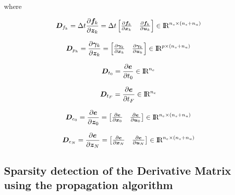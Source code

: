 \documentclass[12pt]{article}
\newcommand{\real}{\mbox{\rm I$\!$R}}
\begin{document}
\noindent where

\begin{equation}
    \bm{D}_{f_k}=\Delta t \frac{\partial \bm{f}_k}{\partial \bm{z}_k}= \Delta t 
    \begin{bmatrix}
     \frac{\partial \bm{f}_k}{\partial \bm{x}_k} & \frac{\partial \bm{f}_k}{\partial \bm{u}_k} 
    \end{bmatrix} \in \real^{n_s \times (n_s+n_u)}
\end{equation}

\begin{equation}
    \bm{D}_{p_k}=\frac{\partial \bm{\gamma}_k}{\partial \bm{z}_k}= 
    \begin{bmatrix}
     \frac{\partial \bm{\gamma}_k}{\partial \bm{x}_k} & \frac{\partial \bm{\gamma}_k}{\partial \bm{u}_k} 
    \end{bmatrix} \in \real^{p \times (n_s+n_u)}
\end{equation}

\begin{equation}
    \bm{D}_{t_0}=\frac{\partial \bm{e}}{\partial t_0}  \in \real^{n_e}
\end{equation}

\begin{equation}
    \bm{D}_{t_F}=\frac{\partial \bm{e}}{\partial t_F}  \in \real^{n_e}
\end{equation}

\begin{equation}
    \bm{D}_{e_0}=\frac{\partial \bm{e}}{\partial \bm{z}_0}= 
    \begin{bmatrix}
     \frac{\partial \bm{e}}{\partial \bm{x}_0} & \frac{\partial \bm{e}}{\partial \bm{u}_0} 
    \end{bmatrix} \in \real^{n_e \times (n_s+n_u)}
\end{equation}

\begin{equation}
    \bm{D}_{e_N}=\frac{\partial \bm{e}}{\partial \bm{z}_N}= 
    \begin{bmatrix}
     \frac{\partial \bm{e}}{\partial \bm{x}_N} & \frac{\partial \bm{e}}{\partial \bm{u}_N} 
    \end{bmatrix} \in \real^{n_e \times (n_s+n_u)}
\end{equation}

\subsection{Sparsity detection of the Derivative Matrix using the propagation algorithm}
\end{document}

